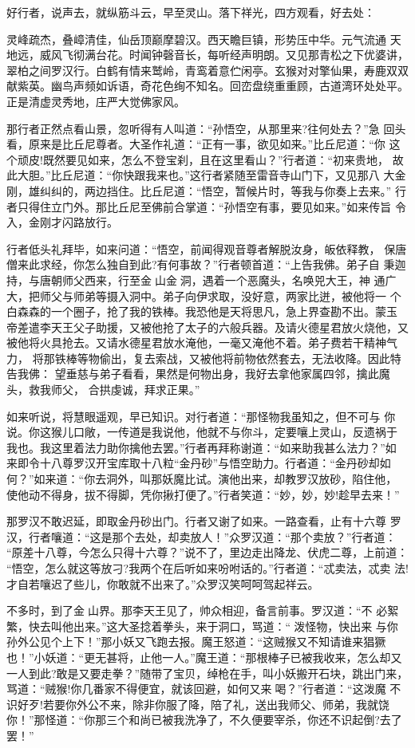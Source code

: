 好行者，说声去，就纵筋斗云，早至灵山。落下祥光，四方观看，好去处：

灵峰疏杰，叠嶂清佳，仙岳顶巅摩碧汉。西天瞻巨镇，形势压中华。元气流通
天地远，威风飞彻满台花。时闻钟磬音长，每听经声明朗。又见那青松之下优婆讲，
翠柏之间罗汉行。白鹤有情来鹫岭，青鸾着意伫闲亭。玄猴对对擎仙果，寿鹿双双
献紫英。幽鸟声频如诉语，奇花色绚不知名。回峦盘绕重重顾，古道湾环处处平。
正是清虚灵秀地，庄严大觉佛家风。

那行者正然点看山景，忽听得有人叫道：“孙悟空，从那里来?往何处去？”急
回头看，原来是比丘尼尊者。大圣作礼道：“正有一事，欲见如来。”比丘尼道：“你
这个顽皮!既然要见如来，怎么不登宝刹，且在这里看山？”行者道：“初来贵地，
故此大胆。”比丘尼道：“你快跟我来也。”这行者紧随至雷音寺山门下，又见那八
大金刚，雄纠纠的，两边挡住。比丘尼道：“悟空，暂候片时，等我与你奏上去来。”
行者只得住立门外。那比丘尼至佛前合掌道：“孙悟空有事，要见如来。”如来传旨
令入，金刚才闪路放行。

行者低头礼拜毕，如来问道：“悟空，前闻得观音尊者解脱汝身，皈依释教，
保唐僧来此求经，你怎么独自到此?有何事故？”行者顿首道：“上告我佛。弟子自
秉迦持，与唐朝师父西来，行至金山金洞，遇着一个恶魔头，名唤兕大王，神
通广大，把师父与师弟等摄入洞中。弟子向伊求取，没好意，两家比迸，被他将一
个白森森的一个圈子，抢了我的铁棒。我恐他是天将思凡，急上界查勘不出。蒙玉
帝差遣李天王父子助援，又被他抢了太子的六般兵器。及请火德星君放火烧他，又
被他将火具抢去。又请水德星君放水淹他，一毫又淹他不着。弟子费若干精神气力，
将那铁棒等物偷出，复去索战，又被他将前物依然套去，无法收降。因此特告我佛：
望垂慈与弟子看看，果然是何物出身，我好去拿他家属四邻，擒此魔头，救我师父，
合拱虔诚，拜求正果。”

如来听说，将慧眼遥观，早已知识。对行者道：“那怪物我虽知之，但不可与
你说。你这猴儿口敞，一传道是我说他，他就不与你斗，定要嚷上灵山，反遗祸于
我也。我这里着法力助你擒他去罢。”行者再拜称谢道：“如来助我甚么法力？”如
来即令十八尊罗汉开宝库取十八粒“金丹砂”与悟空助力。行者道：“金丹砂却如
何？”如来道：“你去洞外，叫那妖魔比试。演他出来，却教罗汉放砂，陷住他，
使他动不得身，拔不得脚，凭你揪打便了。”行者笑道：“妙，妙，妙!趁早去来！”

那罗汉不敢迟延，即取金丹砂出门。行者又谢了如来。一路查看，止有十六尊
罗汉，行者嚷道：“这是那个去处，却卖放人！”众罗汉道：“那个卖放？”行者道：
“原差十八尊，今怎么只得十六尊？”说不了，里边走出降龙、伏虎二尊，上前道：
“悟空，怎么就这等放刁?我两个在后听如来吩咐话的。”行者道：“忒卖法，忒卖
法!才自若嚷迟了些儿，你敢就不出来了。”众罗汉笑呵呵驾起祥云。

不多时，到了金山界。那李天王见了，帅众相迎，备言前事。罗汉道：“不
必絮繁，快去叫他出来。”这大圣捻着拳头，来于洞口，骂道：“泼怪物，快出来
与你孙外公见个上下！”那小妖又飞跑去报。魔王怒道：“这贼猴又不知请谁来猖獗
也！”小妖道：“更无甚将，止他一人。”魔王道：“那根棒子已被我收来，怎么却又
一人到此?敢是又要走拳？”随带了宝贝，绰枪在手，叫小妖搬开石块，跳出门来，
骂道：“贼猴!你几番家不得便宜，就该回避，如何又来喝？”行者道：“这泼魔
不识好歹!若要你外公不来，除非你服了降，陪了礼，送出我师父、师弟，我就饶
你！”那怪道：“你那三个和尚已被我洗净了，不久便要宰杀，你还不识起倒?去了
罢！”

